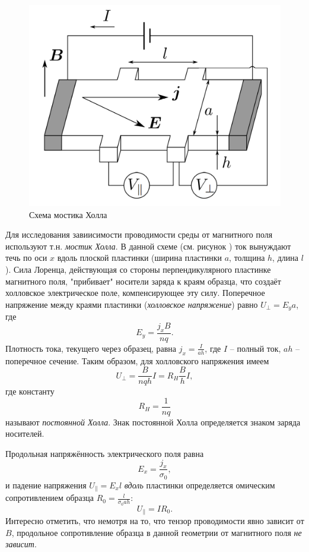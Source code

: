 \documentclass[a4paper,10pt]{article}
\begin{document}
\begin{figure}[h]
	\centering
	\includegraphics[scale=0.35]{th}
	\caption{Схема мостика Холла} \label{th}
\end{figure}

Для исследования завиисимости проводимости среды от магнитного поля используют т.н. \textit{мостик Холла}. В данной схеме (см. рисунок ) ток вынуждают течь по оси $x$ вдоль плоской пластинки (ширина пластинки $a$, толщина $h$, длина $l$). Сила Лоренца, действующая со стороны перпендикулярного пластинке магнитного поля, "прибивает" носители заряда к краям образца, что создаёт холловское электрическое поле, компенсирующее эту силу. Поперечное напряжение между краями пластинки (\textit{холловское напряжение}) равно $U_{\perp}=E_ya$, где\[E_y=\frac{j_xB}{nq}.\]Плотность тока, текущего через образец, равна $j_x=\frac{I}{ah}$, где $I$ -- полный ток, $ah$ -- поперечное сечение. Таким образом, для холловского напряжения имеем\[U_{\perp}=\frac{B}{nqh}I=R_H\frac{B}{h}I,\]где константу\[R_H=\frac{1}{nq}\]называют \textit{постоянной Холла}. Знак постоянной Холла определяется знаком заряда носителей.

Продольная напряжённость электрического поля равна\[E_x=\frac{j_x}{\sigma_0},\]и падение напряжения $U_{\parallel}=E_xl$ \textit{вдоль} пластинки определяется омическим сопротивлением образца $R_0=\frac{l}{\sigma_0ah}$:\[U_{\parallel}=IR_0.\]Интересно отметить, что немотря на то, что тензор проводимости явно зависит от $B$, продольное сопротивление образца в данной геометрии от магнитного поля \textit{не зависит}.
\end{document}

